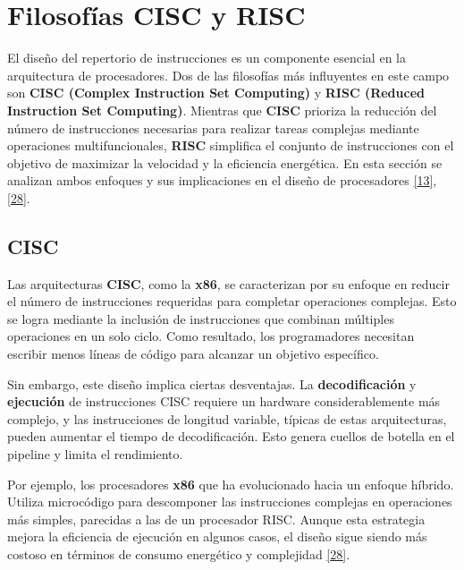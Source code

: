 \documentclass[12pt,oneside]{templates/unerthesis}
\begin{document}
\hypertarget{filosofuxedas-cisc-y-risc}{%
\section{Filosofías CISC y RISC}\label{filosofuxedas-cisc-y-risc}}

El diseño del repertorio de instrucciones es un componente esencial en la arquitectura de procesadores. Dos de las filosofías más influyentes en este campo son \textbf{CISC (Complex Instruction Set Computing)} y \textbf{RISC (Reduced Instruction Set Computing)}. Mientras que \textbf{CISC} prioriza la reducción del número de instrucciones necesarias para realizar tareas complejas mediante operaciones multifuncionales, \textbf{RISC} simplifica el conjunto de instrucciones con el objetivo de maximizar la velocidad y la eficiencia energética. En esta sección se analizan ambos enfoques y sus implicaciones en el diseño de procesadores \protect\hyperlink{ref-hennessy_computer_2012}{{[}13{]}}, \protect\hyperlink{ref-patterson_computer_2014}{{[}28{]}}.

\hypertarget{cisc}{%
\subsection{CISC}\label{cisc}}

Las arquitecturas \textbf{CISC}, como la \textbf{x86}, se caracterizan por su enfoque en reducir el número de instrucciones requeridas para completar operaciones complejas. Esto se logra mediante la inclusión de instrucciones que combinan múltiples operaciones en un solo ciclo. Como resultado, los programadores necesitan escribir menos líneas de código para alcanzar un objetivo específico.

Sin embargo, este diseño implica ciertas desventajas. La \textbf{decodificación} y \textbf{ejecución} de instrucciones CISC requiere un hardware considerablemente más complejo, y las instrucciones de longitud variable, típicas de estas arquitecturas, pueden aumentar el tiempo de decodificación. Esto genera cuellos de botella en el pipeline y limita el rendimiento.

Por ejemplo, los procesadores \textbf{x86} que ha evolucionado hacia un enfoque híbrido. Utiliza microcódigo para descomponer las instrucciones complejas en operaciones más simples, parecidas a las de un procesador RISC. Aunque esta estrategia mejora la eficiencia de ejecución en algunos casos, el diseño sigue siendo más costoso en términos de consumo energético y complejidad \protect\hyperlink{ref-patterson_computer_2014}{{[}28{]}}.
\end{document}
